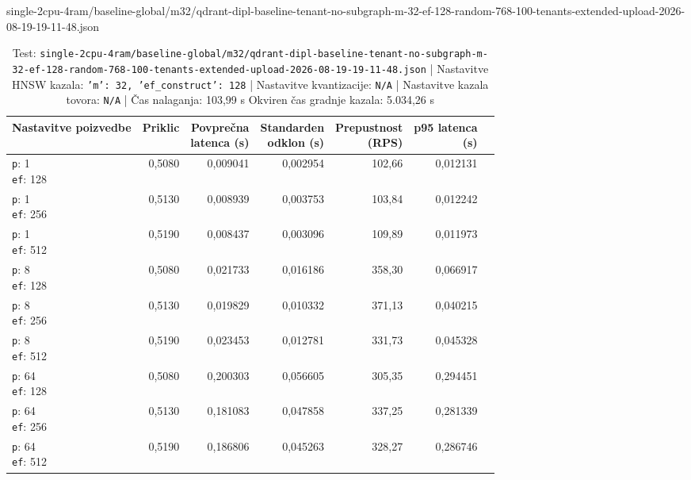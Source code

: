 \begin{table}[htbp]
  \centering
\small
  \caption{single-2cpu-4ram/baseline-global/m32/qdrant-dipl-baseline-tenant-no-subgraph-m-32-ef-128-random-768-100-tenants-extended-upload-2026-08-19-19-11-48.json}
  \label{tab:single-2cpu-4ram:baseline-global:m32:qdrant-dipl-baseline-tenant-no-subgraph-m-32-ef-128-random-768-100-tenants-extended-upload-2026-08-19-19-11-48.json}
  \begin{tabularx}{\textwidth}{Xrrrrrr}
    \toprule
    Nastavitve poizvedbe & Priklic & \makecell{Povprečna\\latenca (s)} & \makecell{Standarden\\odklon (s)} & \makecell{Prepustnost\\(RPS)} & \makecell{p95 latenca\\(s)}  \\
    \midrule
    \makecell{\texttt{p}: 1\\\texttt{ef}: 128} & 0,5080 & 0,009041 & 0,002954 & 102,66 & 0,012131 \\
    \makecell{\texttt{p}: 1\\\texttt{ef}: 256} & 0,5130 & 0,008939 & 0,003753 & 103,84 & 0,012242 \\
    \makecell{\texttt{p}: 1\\\texttt{ef}: 512} & 0,5190 & 0,008437 & 0,003096 & 109,89 & 0,011973 \\
    \makecell{\texttt{p}: 8\\\texttt{ef}: 128} & 0,5080 & 0,021733 & 0,016186 & 358,30 & 0,066917 \\
    \makecell{\texttt{p}: 8\\\texttt{ef}: 256} & 0,5130 & 0,019829 & 0,010332 & 371,13 & 0,040215 \\
    \makecell{\texttt{p}: 8\\\texttt{ef}: 512} & 0,5190 & 0,023453 & 0,012781 & 331,73 & 0,045328 \\
    \makecell{\texttt{p}: 64\\\texttt{ef}: 128} & 0,5080 & 0,200303 & 0,056605 & 305,35 & 0,294451 \\
    \makecell{\texttt{p}: 64\\\texttt{ef}: 256} & 0,5130 & 0,181083 & 0,047858 & 337,25 & 0,281339 \\
    \makecell{\texttt{p}: 64\\\texttt{ef}: 512} & 0,5190 & 0,186806 & 0,045263 & 328,27 & 0,286746 \\
    \bottomrule
  \end{tabularx}
\caption* {Test: \texttt{single-2cpu-4ram/baseline-global/m32/qdrant-dipl-baseline-tenant-no-subgraph-m-32-ef-128-random-768-100-tenants-extended-upload-2026-08-19-19-11-48.json} | Nastavitve HNSW kazala: \texttt{{'m': 32, 'ef\_construct': 128}} | Nastavitve kvantizacije: \texttt{N/A} | Nastavitve kazala tovora: \texttt{N/A} | Čas nalaganja: 103,99 s Okviren čas gradnje kazala: 5.034,26 s}\end{table}


